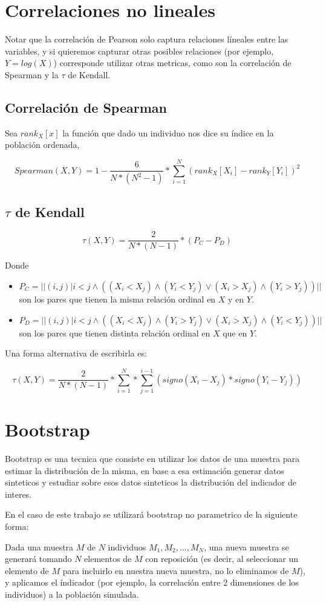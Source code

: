 \section{Correlaciones no lineales}

Notar que la correlación de Pearson solo captura relaciones líneales entre las variables, y si quieremos capturar otras posibles relaciones (por ejemplo, $Y = log(X)$) corresponde utilizar otras metricas, como son la correlación de Spearman y la $\tau$ de Kendall.

\subsection{Correlación de Spearman}

Sea $rank_X[x]$ la función que dado un individuo nos dice su índice en la población ordenada,

$$
    Spearman(X,Y) = 1 - \frac{6}{N*(N^2-1)} * \sum_{i=1}^N (rank_X[X_i]-rank_Y[Y_i])^2
$$

\subsection{$\tau$ de Kendall}

$$
    \tau(X,Y) = \frac{2}{N*(N-1)} * ( P_C - P_D )
$$

Donde 

\begin{itemize}
    \item $P_C = ||{(i,j)| i<j \wedge ( (X_i < X_j) \wedge (Y_i < Y_j) \vee (X_i > X_j) \wedge (Y_i > Y_j))}||$ son los pares que tienen la misma relación ordinal en $X$ y en $Y$.
    \item $P_D = ||{(i,j)| i<j \wedge ( (X_i < X_j) \wedge (Y_i > Y_j) \vee (X_i > X_j) \wedge (Y_i < Y_j))}||$ son los pares que tienen distinta relación ordinal en $X$ que en $Y$.
\end{itemize}

Una forma alternativa de escribirla es:

$$
    \tau(X,Y) = \frac{2}{N*(N-1)} * \sum_{i=1}^{N} * \sum_{j=1}^{i-1} (signo(X_i-X_j) * signo(Y_i-Y_j))
$$

\section{Bootstrap}

Bootstrap es una tecnica que consiste en utilizar los datos de una muestra para estimar la distribución de la misma, en base a esa estimación generar datos sinteticos y estudiar sobre esos datos sinteticos la distribución del indicador de interes.

En el caso de este trabajo se utilizará bootstrap no parametrico de la siguiente forma:

Dada una muestra $M$ de $N$ individuos $M_1, M_2, \dots, M_N$, una nueva muestra se generará tomando $N$ elementos de $M$ con reposición (es decir, al seleccionar un elemento de $M$ para incluirlo en nuestra nueva muestra, no lo eliminamos de $M$), y aplicamos el índicador (por ejemplo, la correlación entre 2 dimensiones de los individuos) a la población simulada. 
